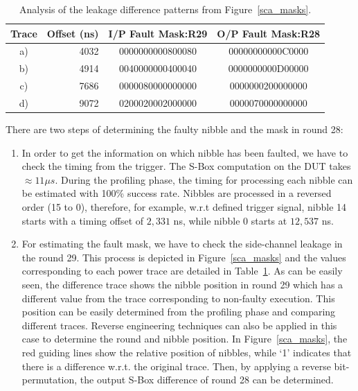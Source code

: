 \documentclass[10pt, conference, compsocconf]{IEEEtran}  %
\numberwithin{Definition}{section}
\numberwithin{Claim}{section}
\begin{document}
\begin{table}
\centering
\caption{Analysis of the leakage difference patterns from Figure~\ref{sca_masks}.}
\label{sca_masks_analysis}
\begin{tabular}{c r c c}
\textbf{Trace} & \textbf{Offset (ns)} & \textbf{I/P Fault Mask:R29} & \textbf{O/P Fault Mask:R28} \\ \hline
a) & 4032 & 0000000000800080 & 00000000000C0000 \\
b) & 4914 & 0040000000400040 & 0000000000D00000 \\
c) & 7686 & 0000080000000000 & 0000000200000000 \\
d) & 9072 & 0200020002000000 & 0000070000000000 \\
\hline
\end{tabular}
\vspace{-0.3cm}
\end{table}

There are two steps of determining the faulty nibble and the mask in round 28:
\begin{enumerate}
	\item In order to get the information on which nibble has been faulted, we have to check the timing from the trigger. The S-Box computation on the DUT takes $\approx 11 \mu s$. During the profiling phase, the timing for processing each nibble can be estimated with 100\% success rate. Nibbles are processed in a reversed order (15 to 0), therefore, for example, w.r.t defined trigger signal, nibble 14 starts with a timing offset of $2,331$ ns, while nibble 0 starts at $12,537$ ns.
    \item For estimating the fault mask, we have to check the side-channel leakage in the round 29. This process is depicted in Figure~\ref{sca_masks} and the values corresponding to each power trace are detailed in Table~\ref{sca_masks_analysis}. As can be easily seen, the difference trace shows the nibble position in round 29 which has a different value from the trace corresponding to non-faulty execution. This position can be easily determined from the profiling phase and comparing different traces. Reverse engineering techniques can also be applied in this case to determine the round and nibble position. In Figure~\ref{sca_masks}, the red guiding lines show the relative position of nibbles, while `1' indicates that there is a difference w.r.t. the original trace. Then, by applying a reverse bit-permutation, the output S-Box difference of round 28 can be determined.
\end{enumerate}
\end{document}
